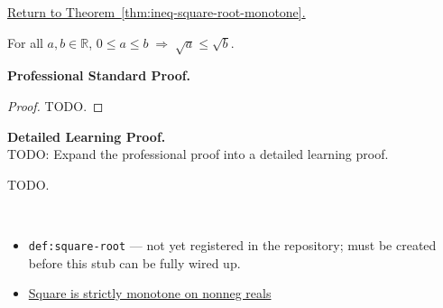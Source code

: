 
\newpage
{}
\label{prf:ineq-square-root-monotone}

\begin{remark*}[Return]
\hyperref[thm:ineq-square-root-monotone]{Return to Theorem~\ref*{thm:ineq-square-root-monotone}.}
\end{remark*}

\begin{theorem*}
For all $a, b \in \mathbb{R}$,
$0 \le a \le b \;\Rightarrow\; \sqrt{a} \le \sqrt{b}$.
\end{theorem*}

\textbf{Professional Standard Proof.}~\\
\begin{proof}
TODO.
\end{proof}

\textbf{Detailed Learning Proof.}~\\
TODO: Expand the professional proof into a detailed learning proof.


\begin{remark*}
TODO.
\end{remark*}

\begin{remark*}[Dependencies]~\\
\begin{itemize}
  \item \texttt{def:square-root} --- not yet registered in the repository;
        must be created before this stub can be fully wired up.
  \item \hyperref[thm:ineq-square-monotone]{Square is strictly monotone on nonneg reals}
\end{itemize}
\end{remark*}
